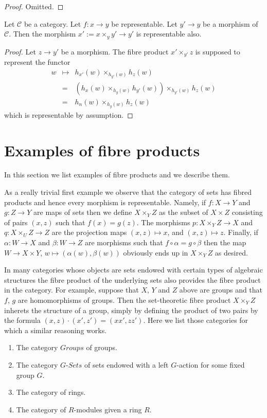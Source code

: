 \begin{proof}
Omitted.
\end{proof}

\begin{lemma}
\label{lemma-base-change-representable}
Let $\mathcal{C}$ be a category.
Let $f : x \to y$ be representable.
Let $y' \to y$ be a morphism of $\mathcal{C}$.
Then the morphism $x' := x \times_y y' \to y'$ is representable also.
\end{lemma}

\begin{proof}
Let $z \to y'$ be a morphism. The fibre product
$x' \times_{y'} z$ is supposed to represent the
functor
\begin{eqnarray*}
w & \mapsto & h_{x'}(w)\times_{h_{y'}(w)} h_z(w) \\
& = & (h_x(w) \times_{h_y(w)} h_{y'}(w)) \times_{h_{y'}(w)} h_z(w) \\
& = & h_n(w) \times_{h_y(w)} h_z(w)
\end{eqnarray*}
which is representable by assumption.
\end{proof}

\section{Examples of fibre products}
\label{section-example-fibre-products}

\noindent
In this section we list examples of fibre products and
we describe them.

\medskip\noindent 
As a really trivial first example we observe 
that the category of sets has fibred products and hence every
morphism is representable. Namely, if $f : X \to Y$
and $g : Z \to Y$ are maps of sets then we define
$X\times_Y Z$ as the subset of $X\times Z$ consisting
of pairs $(x,z)$ such that $f(x) = g(z)$. The morphisms
$p : X\times_Y Z \to X$ and $q : X\times_U Z \to Z$ are
the projection maps $(x,z) \mapsto x$, and $(x,z) \mapsto z$.
Finally, if $\alpha : W \to X$ and $\beta : W \to Z$ 
are morphisms such that $f \circ \alpha = g \circ \beta$
then the map $W \to X\times Y$, $w\mapsto (\alpha(w), \beta(w))$
obviously ends up in $X\times_YZ$ as desired.

\medskip\noindent
In many categories whose objects are sets endowed with certain types of
algebraic structures the fibre product of the underlying sets also
provides the fibre product in the category. For example, suppose
that $X$, $Y$ and $Z$ above are groups and that $f$, $g$ are
homomorphisms of groups. Then the set-theoretic fibre product
$X\times_Y Z$ inherets the structure of a group, simply by
defining the product of two pairs by the formula
$(x,z) \cdot (x',z') = (xx', zz')$. Here we list those categories
for which a similar reasoning works.
\begin{enumerate}
\item The category $\textit{Groups}$ of groups.
\item The category $G\textit{-Sets}$ of sets
endowed with a left $G$-action for some fixed group $G$.
\item The category of rings.
\item The category of $R$-modules given a ring $R$.
\end{enumerate}

